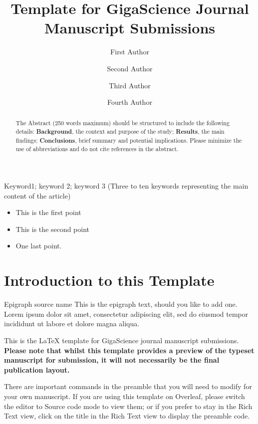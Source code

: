 \documentclass[a4paper,num-refs]{oup-contemporary}
\title{Template for GigaScience Journal Manuscript Submissions}
\author[1,\authfn{1},\authfn{2}]{First Author}
\author[2,\authfn{1},\authfn{2}]{Second Author}
\author[2]{Third Author}
\author[2,\authfn{1}]{Fourth Author}
\affil[1]{First Institution}
\affil[2]{Second Institution}
\begin{document}
\begin{frontmatter}
\maketitle
\begin{abstract}
The Abstract (250 words maximum) should be structured to include the following details: \textbf{Background}, the context and purpose of the study; \textbf{Results}, the main findings; \textbf{Conclusions}, brief summary and potential implications. Please minimize the use of abbreviations and do not cite references in the abstract.
\end{abstract}

\begin{keywords}
Keyword1; keyword 2; keyword 3 (Three to ten keywords representing the main content of the article)
\end{keywords}
\end{frontmatter}

\begin{keypoints*}
\begin{itemize}
\item This is the first point
\item This is the second point
\item One last point.
\end{itemize}
\end{keypoints*}

\section{Introduction to this Template}

\begin{epigraph}{Epigraph source name}
This is the epigraph text, should you like to add one. Lorem ipsum dolor sit amet, consectetur adipiscing elit, sed do eiusmod tempor incididunt ut labore et dolore magna aliqua. 
\end{epigraph}

This is the \LaTeX{} template for GigaScience journal manuscript submissions. \textbf{Please note that whilst this template provides a preview of the typeset manuscript for submission, it will not necessarily be the final publication layout.}

There are important commands in the preamble that you will need to modify for your own manuscript. If you are using this template on Overleaf, please switch the editor to Source code mode to view them; or if you prefer to stay in the Rich Text view, click on the title in the Rich Text view to display the preamble code.
\end{document}
